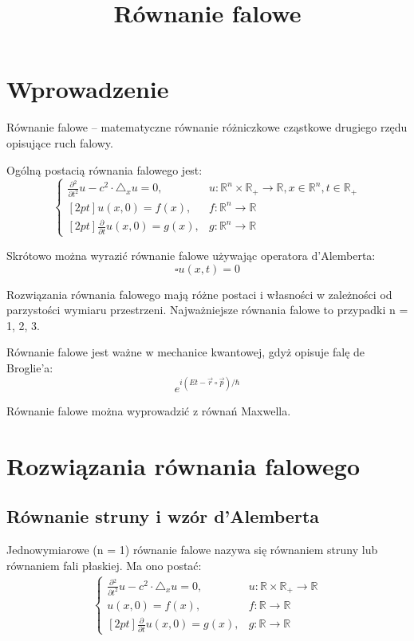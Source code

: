 \documentclass{article}
\begin{document}
\title{Równanie falowe}
\maketitle

\section*{Wprowadzenie}
Równanie falowe – matematyczne równanie różniczkowe cząstkowe drugiego rzędu opisujące ruch falowy. 

Ogólną postacią równania falowego jest: 
\begin{displaymath}
{\begin{cases}{\frac {\partial {}^{2}}{\partial t^{2}}}u-c^{2}\cdot \triangle _{x}u=0,&u:\mathbb {R} ^{n}\times \mathbb {R} _{+}\to {}\mathbb {R} ,x\in \mathbb {R} ^{n},t\in \mathbb {R} _{+}\\{[2pt]}u(x,0)=f(x),&f:\mathbb {R} ^{n}\to \mathbb {R} \\{[2pt]}{\frac {\partial {}}{\partial t}}u(x,0)=g(x),&g:\mathbb {R} ^{n}\to \mathbb {R} \end{cases}}
\end{displaymath}

Skrótowo można wyrazić równanie falowe używając operatora d’Alemberta: 
$$ \square u(x,t)=0 $$

Rozwiązania równania falowego mają różne postaci i własności w zależności od parzystości wymiaru przestrzeni. Najważniejsze równania falowe to przypadki n = 1, 2, 3.

Równanie falowe jest ważne w mechanice kwantowej, gdyż opisuje falę de Broglie’a: 
\[ e^{i(Et-{\vec {r}}\circ {\vec {p}})/\hbar } \]

Równanie falowe można wyprowadzić z równań Maxwella. 

\section*{Rozwiązania równania falowego}
\subsection*{Równanie struny i wzór d'Alemberta}
Jednowymiarowe (n = 1) równanie falowe nazywa się równaniem struny lub równaniem fali płaskiej. Ma ono postać: 
\begin{gather*}
{\begin{cases}{\frac {\partial {}^{2}}{\partial t^{2}}}u-c^{2}\cdot \triangle _{x}u=0,&u:\mathbb {R} \times \mathbb {R} _{+}\to {}\mathbb {R} \\u(x,0)=f(x),&f:\mathbb {R} \to \mathbb {R} \\{[2pt]}{\frac {\partial {}}{\partial t}}u(x,0)=g(x),&g:\mathbb {R} \to \mathbb {R} \end{cases}}
\end{gather*}
\end{document}
